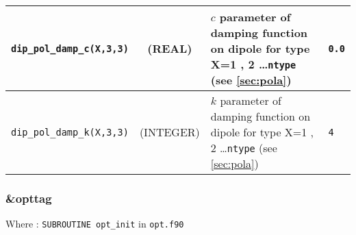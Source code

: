 \documentclass[a4paper,8pt]{article}
\begin{document}
\begin{longtable}{l|c|m{8cm}|m{2cm}}
\hline
\rule[-0.75cm]{0cm}{1.5cm}
\verb?dip_pol_damp_c(X,3,3)?     
                 & (REAL)             & $c$ parameter of damping function on dipole for type X=1 , 2 \ldots \verb?ntype? (see \ref{sec:pola})
                                                                                                                            & \verb?0.0? \\
\hline
\rule[-0.75cm]{0cm}{1.5cm}
\verb?dip_pol_damp_k(X,3,3)?     
                 & (INTEGER)          & $k$ parameter of damping function on dipole for type X=1 , 2 \ldots \verb?ntype? (see \ref{sec:pola})
                                                                                                                            & \verb?4? \\
\hline
\hline
\end{longtable}

\subsubsection{\&opttag}

Where : \verb?SUBROUTINE opt_init? in \verb?opt.f90?
\newline
\end{document}
